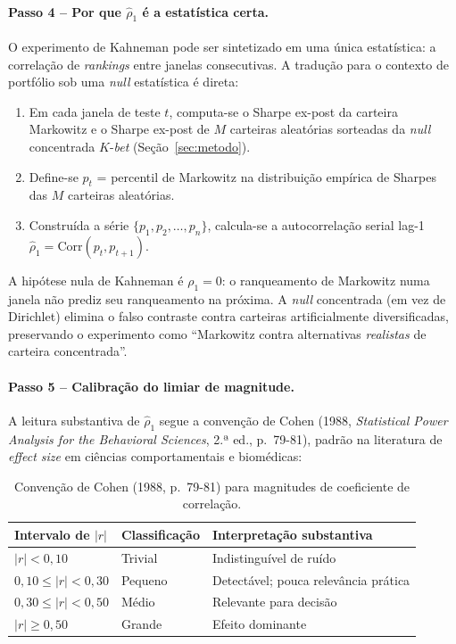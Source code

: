 \documentclass[12pt,a4paper,oneside]{article}
\begin{document}
\paragraph{Passo 4 -- Por que $\hat{\rho}_1$ é a estatística certa.}
O experimento de Kahneman pode ser sintetizado em uma única
estatística: a correlação de \textit{rankings} entre janelas
consecutivas. A tradução para o contexto de portfólio sob uma
\textit{null} estatística é direta:
\begin{enumerate}
\item Em cada janela de teste $t$, computa-se o Sharpe ex-post da
carteira Markowitz e o Sharpe ex-post de $M$ carteiras aleatórias
sorteadas da \textit{null} concentrada $K$-\textit{bet}
(Seção~\ref{sec:metodo}).
\item Define-se $p_t$ = percentil de Markowitz na distribuição
empírica de Sharpes das $M$ carteiras aleatórias.
\item Construída a série $\{p_1, p_2, \ldots, p_n\}$, calcula-se a
autocorrelação serial lag-1 $\hat{\rho}_1 =
\mathrm{Corr}(p_t, p_{t+1})$.
\end{enumerate}
A hipótese nula de Kahneman é $\rho_1 = 0$: o ranqueamento de
Markowitz numa janela não prediz seu ranqueamento na próxima. A
\textit{null} concentrada (em vez de Dirichlet) elimina o falso
contraste contra carteiras artificialmente diversificadas,
preservando o experimento como ``Markowitz contra alternativas
\textit{realistas} de carteira concentrada''.

\paragraph{Passo 5 -- Calibração do limiar de magnitude.}
A leitura substantiva de $\hat{\rho}_1$ segue a convenção de Cohen
(1988, \textit{Statistical Power Analysis for the Behavioral
Sciences}, 2.ª ed., p.~79-81), padrão na literatura de \textit{effect
size} em ciências comportamentais e biomédicas:

\begin{table}[H]
\centering
\caption{Convenção de Cohen (1988, p.~79-81) para magnitudes de coeficiente de correlação.}
\small
\begin{tabular}{lll}
\toprule
\textbf{Intervalo de $|r|$} & \textbf{Classificação} & \textbf{Interpretação substantiva}\\
\midrule
$|r| < 0{,}10$        & Trivial    & Indistinguível de ruído\\
$0{,}10 \leq |r| < 0{,}30$ & Pequeno    & Detectável; pouca relevância prática\\
$0{,}30 \leq |r| < 0{,}50$ & Médio      & Relevante para decisão\\
$|r| \geq 0{,}50$     & Grande     & Efeito dominante\\
\bottomrule
\end{tabular}
\end{table}
\end{document}
